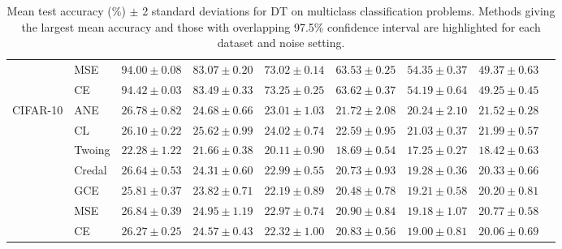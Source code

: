 \documentclass[letterpaper]{article} %
\begin{document}
\begin{table}[t]
\begin{tabular}{clccccccc}
 & MSE    & $94.00 \pm 0.08$ & $83.07 \pm 0.20$ & $73.02 \pm 0.14$ & $63.53 \pm 0.25$ & $54.35 \pm 0.37$ & $49.37 \pm 0.63$ \\ 
 & CE     & $\mathbf{94.42 \pm 0.03}$ & $83.49 \pm 0.33$ & $73.25 \pm 0.25$ & $63.62 \pm 0.37$ & $54.19 \pm 0.64$ & $49.25 \pm 0.45$ \\ 
\hline
\multirow{7}{*}{CIFAR-10}
 & ANE    & $\mathbf{26.78 \pm 0.82}$ & $\mathbf{24.68 \pm 0.66}$ & $\mathbf{23.01 \pm 1.03}$ & $\mathbf{21.72 \pm 2.08}$ & $\mathbf{20.24 \pm 2.10}$ & $\mathbf{21.52 \pm 0.28}$ \\ 
 & CL     & $26.10 \pm 0.22$ & $\mathbf{25.62 \pm 0.99}$ & $\mathbf{24.02 \pm 0.74}$ & $\mathbf{22.59 \pm 0.95}$ & $\mathbf{21.03 \pm 0.37}$ & $\mathbf{21.99 \pm 0.57}$ \\ 
 & Twoing & $22.28 \pm 1.22$ & $21.66 \pm 0.38$ & $20.11 \pm 0.90$ & $18.69 \pm 0.54$ & $17.25 \pm 0.27$ & $18.42 \pm 0.63$ \\ 
 & Credal & $\mathbf{26.64 \pm 0.53}$ & $24.31 \pm 0.60$ & $22.99 \pm 0.55$ & $20.73 \pm 0.93$ & $19.28 \pm 0.36$ & $20.33 \pm 0.66$ \\ 
 & GCE    & $25.81 \pm 0.37$ & $23.82 \pm 0.71$ & $22.19 \pm 0.89$ & $20.48 \pm 0.78$ & $19.21 \pm 0.58$ & $20.20 \pm 0.81$ \\ 
 & MSE    & $\mathbf{26.84 \pm 0.39}$ & $\mathbf{24.95 \pm 1.19}$ & $\mathbf{22.97 \pm 0.74}$ & $20.90 \pm 0.84$ & $19.18 \pm 1.07$ & $20.77 \pm 0.58$ \\ 
 & CE     & $26.27 \pm 0.25$ & $\mathbf{24.57 \pm 0.43}$ & $22.32 \pm 1.00$ & $20.83 \pm 0.56$ & $19.00 \pm 0.81$ & $20.06 \pm 0.69$ \\ 
\hline
\end{tabular} 
\caption{Mean test accuracy (\%) $\pm$ 2 standard deviations for DT on multiclass classification problems. Methods giving the largest mean accuracy and those with overlapping 97.5\% confidence interval are highlighted for each dataset and noise setting.} 
\label{tab:dt-mc}
\end{table} 
\end{document}
